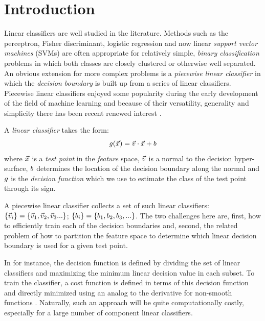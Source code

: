 \section{Introduction}

Linear classifiers are well studied in the literature. Methods such as
the perceptron, Fisher discriminant, logistic regression and now linear
{\it support vector machines} (SVMs) \citep{Michie_etal1994}
are often appropriate for relatively simple,
{\it binary classification} problems in which both classes are closely 
clustered or otherwise well separated.
An obvious extension for more complex problems is a {\it piecewise linear classifier} 
in which the {\it decision boundary} is built up from a series of linear classifiers.
Piecewise linear classifiers enjoyed some popularity during the early 
development of the field of machine learning 
\citep{Osborne1977,Sklansky_Michelotti1980,Lee_Richards1984,Lee_Richards1985}
and because of their versatility, generality and simplicity there has been recent renewed interest 
\citep{Bagirov2005,Kostin2006,Gai_Zhang2010,Webb2012,Wang_Saligrama2013,Pavlidis_etal2016}.

A {\it linear classifier} takes the form:
\begin{equation}
	g(\vec {x}) = \vec v \cdot \vec {x} + b
	\label{linear_classifier}
\end{equation}
where $\vec {x}$ is a {\it test point} in the {\it feature} space,
$\vec v$ is a normal to the decision hyper-surface, 
$b$ determines the location of the decision boundary along the normal
and $g$ is the {\it decision function} 
which we use to estimate the class of the test point through its sign.

A piecewise linear classifier collects a set of such linear classifiers:
$\lbrace \vec v_i \rbrace = \lbrace \vec v_1, \vec v_2,
\vec v_3 ... \rbrace$; $\lbrace b_i \rbrace =
\lbrace b_1, b_2, b_3, ... \rbrace$.
The two challenges here are, first, how to efficiently train each of the
decision boundaries and, second, the related problem of how to partition the 
feature space to determine which linear decision boundary is used for a given 
test point.

In \citet{Bagirov2005} for instance, the decision function is defined by
dividing the set of linear classifiers and maximizing the minimum
linear decision value in each subset.
To train the classifier, a cost function is defined in terms
of this decision function and directly minimized using an
analog to the derivative for non-smooth functions \citep{Bagirov1999}.
Naturally, such an approach will be quite computationally costly,
especially for a large number of component linear classifiers.

